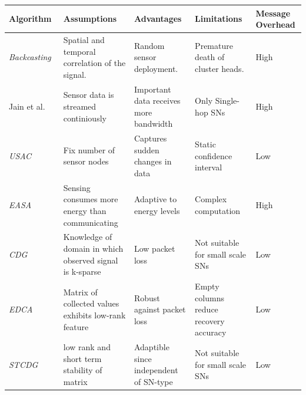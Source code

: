         \def\arraystretch{1.5}%
        \begin{longtable} { |p{}||p{}|p{}|p{}|p{}| } 

        \hline
        Algorithm & Assumptions & Advantages & Limitations & Message Overhead\\
        \hline
        \hline

        \textit{Backcasting}~\cite{willett2004backcasting} & Spatial and
        temporal correlation of the signal. & Random sensor deployment. &
        Premature death of cluster heads. & High\\ %

        Jain et al.~\cite{jain2004adaptive} & Sensor data is streamed
        continiously & Important data receives more bandwidth & Only Single-hop
        \acp{SN} & High\\ %

        \textit{USAC}~\cite{padhy2006utility}& Fix number of sensor nodes &
        Captures sudden changes in data & Static confidence
        interval~\cite{kho2007decentralised} & Low\\ %

        \textit{EASA}~\cite{srbinovski2016energy}& Sensing consumes more energy
        than communicating & Adaptive to energy levels & Complex computation &
        High\\ %

        \textit{CDG}~\cite{luo2009compressive}& Knowledge of domain in which
        observed signal is k-sparse & Low packet loss & Not suitable for small
        scale \acp{SN} & Low\\ %

        \textit{EDCA}~\cite{cheng2010efficient}& Matrix of collected values
        exhibits low-rank feature & Robust against packet loss & Empty columns
        reduce recovery accuracy~\cite{cheng2013stcdg} & Low\\ %

        \textit{STCDG}~\cite{cheng2013stcdg}& low rank and short term stability of
        matrix & Adaptible since independent of \ac{SN}-type & Not suitable for
        small scale \acp{SN}~\cite{yi2015partial} & Low\\ %


\end{longtable}
